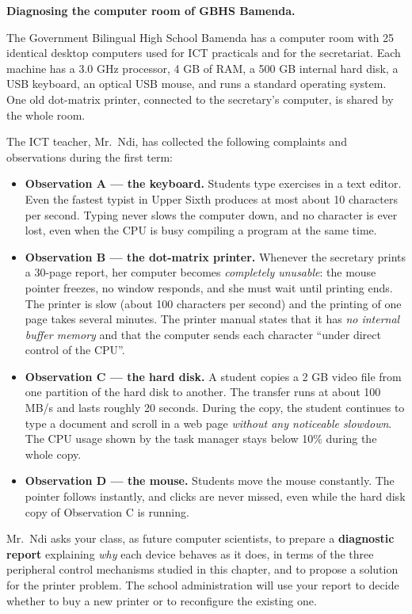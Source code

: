 \documentclass[11pt]{article}
\newcounter{popsec}
\newcounter{popsub}
\newcommand{\courssub}[1]{%
  \stepcounter{popsub}%
  \par\vspace{9pt}\noindent{\popxbold\fontsize{11.5}{13}\selectfont\color{popink}{\color{poporange}\thepopsec.\thepopsub}\hspace{6pt}#1}\par\nopagebreak\vspace{4pt}
}
\begin{document}
\courssub{Situation}

\textbf{Diagnosing the computer room of GBHS Bamenda.}\par\medskip

The Government Bilingual High School Bamenda has a computer room with 25 identical desktop computers used for ICT practicals and for the secretariat. Each machine has a 3.0 GHz processor, 4 GB of RAM, a 500 GB internal hard disk, a USB keyboard, an optical USB mouse, and runs a standard operating system. One old dot-matrix printer, connected to the secretary's computer, is shared by the whole room.

The ICT teacher, Mr.\ Ndi, has collected the following complaints and observations during the first term:

\begin{itemize}
\item \textbf{Observation A --- the keyboard.} Students type exercises in a text editor. Even the fastest typist in Upper Sixth produces at most about 10 characters per second. Typing never slows the computer down, and no character is ever lost, even when the CPU is busy compiling a program at the same time.
\item \textbf{Observation B --- the dot-matrix printer.} Whenever the secretary prints a 30-page report, her computer becomes \emph{completely unusable}: the mouse pointer freezes, no window responds, and she must wait until printing ends. The printer is slow (about 100 characters per second) and the printing of one page takes several minutes. The printer manual states that it has \emph{no internal buffer memory} and that the computer sends each character ``under direct control of the CPU''.
\item \textbf{Observation C --- the hard disk.} A student copies a 2 GB video file from one partition of the hard disk to another. The transfer runs at about 100 MB/s and lasts roughly 20 seconds. During the copy, the student continues to type a document and scroll in a web page \emph{without any noticeable slowdown}. The CPU usage shown by the task manager stays below 10\% during the whole copy.
\item \textbf{Observation D --- the mouse.} Students move the mouse constantly. The pointer follows instantly, and clicks are never missed, even while the hard disk copy of Observation C is running.
\end{itemize}

Mr.\ Ndi asks your class, as future computer scientists, to prepare a \textbf{diagnostic report} explaining \emph{why} each device behaves as it does, in terms of the three peripheral control mechanisms studied in this chapter, and to propose a solution for the printer problem. The school administration will use your report to decide whether to buy a new printer or to reconfigure the existing one.
\end{document}
